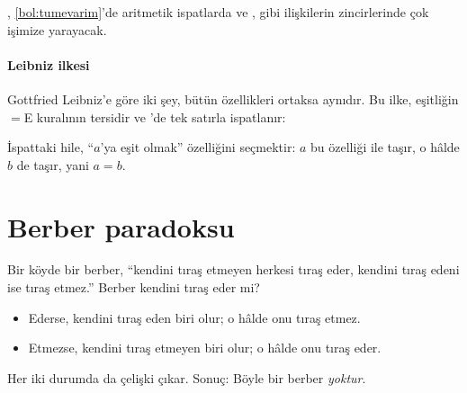 
\noindent {}, \cref{bol:tumevarim}'de aritmetik ispatlarda ve
\lc{<},  gibi ilişkilerin zincirlerinde çok işimize yarayacak.

\paragraph{Leibniz ilkesi}
Gottfried Leibniz'e göre iki şey, bütün özellikleri ortaksa aynıdır.
Bu ilke, eşitliğin $=$E kuralının tersidir ve \Lean{}'de tek satırla
ispatlanır:


\noindent İspattaki hile, ``$a$'ya eşit olmak'' özelliğini seçmektir:
$a$ bu özelliği  ile taşır, o hâlde $b$ de taşır, yani $a = b$.

\section{Berber paradoksu}\label{sec:berber}

\begin{gunlukornek}
Bir köyde bir berber, ``kendini tıraş etmeyen herkesi tıraş eder,
kendini tıraş edeni ise tıraş etmez.'' Berber kendini tıraş eder mi?
\begin{itemize}
  \item Ederse, kendini tıraş eden biri olur; o hâlde onu tıraş etmez.
  \item Etmezse, kendini tıraş etmeyen biri olur; o hâlde onu tıraş eder.
\end{itemize}
Her iki durumda da çelişki çıkar. Sonuç: Böyle bir berber \emph{yoktur}.
\end{gunlukornek}

